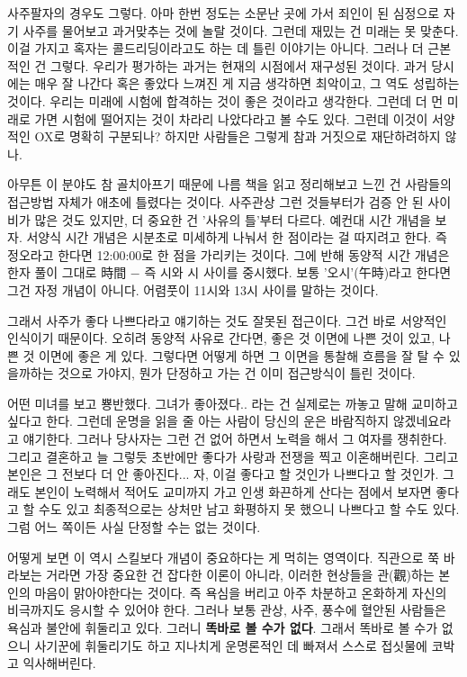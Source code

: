 사주팔자의 경우도 그렇다. 아마 한번 정도는 소문난 곳에 가서 죄인이 된 심정으로 자기 사주를 물어보고 과거맞추는 것에 놀랄 것이다.
그런데 재밌는 건 미래는 못 맞춘다. 이걸 가지고 혹자는 콜드리딩이라고도 하는 데 틀린 이야기는 아니다.
그러나 더 근본적인 건 그렇다. 우리가 평가하는 과거는 현재의 시점에서 재구성된 것이다.
과거 당시에는 매우 잘 나간다 혹은 좋았다 느껴진 게 지금 생각하면 최악이고, 그 역도 성립하는 것이다.
우리는 미래에 시험에 합격하는 것이 좋은 것이라고 생각한다. 그런데 더 먼 미래로 가면 시험에 떨어지는 것이 차라리 나았다라고 볼 수도 있다.
그런데 이것이 서양적인 OX로 명확히 구분되나?
하지만 사람들은 그렇게 참과 거짓으로 재단하려하지 않나.
\vspace{5mm}

아무튼 이 분야도 참 골치아프기 때문에 나름 책을 읽고 정리해보고 느낀 건
사람들의 접근방법 자체가 애초에 틀렸다는 것이다.
사주관상 그런 것들부터가 검증 안 된 사이비가 많은 것도 있지만, 더 중요한 건 '사유의 틀'부터 다르다.
예컨대 시간 개념을 보자. 서양식 시간 개념은 시분초로 미세하게 나눠서 한 점이라는 걸 따지려고 한다.
즉 정오라고 한다면 12:00:00로 한 점을 가리키는 것이다.
그에 반해 동양적 시간 개념은 한자 풀이 그대로 時間 $-$ 즉 시와 시 사이를 중시했다.
보통 '오시'(午時)라고 한다면 그건 자정 개념이 아니다. 어렴풋이 11시와 13시 사이를 말하는 것이다.
\vspace{5mm}

그래서 사주가 좋다 나쁘다라고 얘기하는 것도 잘못된 접근이다. 그건 바로 서양적인 인식이기 때문이다.
오히려 동양적 사유로 간다면, 좋은 것 이면에 나쁜 것이 있고, 나쁜 것 이면에 좋은 게 있다.
그렇다면 어떻게 하면 그 이면을 통찰해 흐름을 잘 탈 수 있을까하는 것으로 가야지, 뭔가 단정하고 가는 건 이미 접근방식이 틀린 것이다.
\vspace{5mm}

어떤 미녀를 보고 뿅반했다. 그녀가 좋아졌다.. 라는 건 실제로는 까놓고 말해 교미하고 싶다고 한다.
그런데 운명을 읽을 줄 아는 사람이 당신의 운은 바람직하지 않겠네요라고 얘기한다.
그러나 당사자는 그런 건 없어 하면서 노력을 해서 그 여자를 쟁취한다. 그리고 결혼하고 늘 그렇듯 초반에만 좋다가
사랑과 전쟁을 찍고 이혼해버린다. 그리고 본인은 그 전보다 더 안 좋아진다...
자, 이걸 좋다고 할 것인가 나쁘다고 할 것인가.
그래도 본인이 노력해서 적어도 교미까지 가고 인생 화끈하게 산다는 점에서 보자면 좋다고 할 수도 있고
최종적으로는 상처만 남고 화평하지 못 했으니 나쁘다고 할 수도 있다.
그럼 어느 쪽이든 사실 단정할 수는 없는 것이다.
\vspace{5mm}

어떻게 보면 이 역시 스킬보다 개념이 중요하다는 게 먹히는 영역이다.
직관으로 쭉 바라보는 거라면 가장 중요한 건 잡다한 이론이 아니라, 이러한 현상들을 관(觀)하는 본인의 마음이 맑아야한다는 것이다.
즉 욕심을 버리고 아주 차분하고 온화하게 자신의 비극까지도 응시할 수 있어야 한다.
그러나 보통 관상, 사주, 풍수에 혈안된 사람들은 욕심과 불안에 휘둘리고 있다. 그러니 \textbf{똑바로 볼 수가 없다}.
그래서 똑바로 볼 수가 없으니 사기꾼에 휘둘리기도 하고 지나치게 운명론적인 데 빠져서 스스로 접싯물에 코박고 익사해버린다.
\vspace{5mm}




